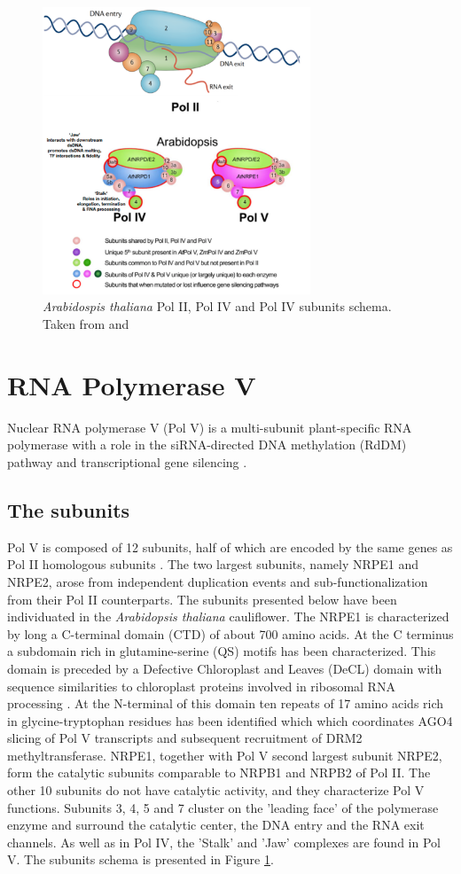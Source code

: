 \documentclass[a4paper, twocolumn]{article}
\begin{document}
\begin{figure}
	\includegraphics[width=8cm]{my_subunits.png}
	\caption{\textit{Arabidospis thaliana} Pol II, Pol IV and Pol IV subunits schema. Taken from \cite{HAAG2011} and \cite{ZHOU2015}}
	\label{fig:subunits}
\end{figure}

\section{RNA Polymerase V}
Nuclear RNA polymerase V (Pol V) is a multi-subunit plant-specific RNA polymerase with a role in the siRNA-directed DNA methylation (RdDM) pathway and transcriptional gene silencing \cite{ZHOU2015}.

\subsection{The subunits}
Pol V is composed of 12 subunits, half of which are encoded by the same genes as Pol II homologous subunits \cite{ZHOU2015}. The two largest subunits, namely NRPE1 and NRPE2, arose from independent duplication events and sub-functionalization from their Pol II counterparts. The subunits presented below have been individuated in the  \textit{Arabidopsis thaliana} cauliflower. 
The NRPE1 is characterized by long a C-terminal domain (CTD) of about 700 amino acids. At the C terminus a subdomain rich in glutamine-serine (QS) motifs has been characterized. This domain is preceded by a Defective Chloroplast and Leaves (DeCL) domain with sequence similarities to chloroplast proteins involved in ribosomal RNA processing \cite{HUANG2015}. At the N-terminal of this domain ten repeats of 17 amino acids rich in glycine-tryptophan residues has been identified which which coordinates AGO4 slicing of Pol V transcripts and subsequent recruitment of DRM2 methyltransferase.
NRPE1, together with Pol V second largest subunit NRPE2, form the catalytic subunits comparable to NRPB1 and NRPB2 of Pol II. 
The other 10 subunits do not have catalytic activity, and they characterize Pol V functions. Subunits 3, 4, 5  and 7 cluster on the 'leading face' of the polymerase enzyme and surround the catalytic center, the DNA entry and the RNA exit channels.
As well as in Pol IV, the 'Stalk' and 'Jaw' complexes are found in Pol V. The subunits schema is presented in Figure \ref{fig:subunits}.
\end{document}
